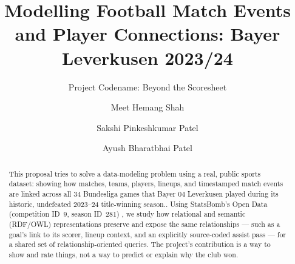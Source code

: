 \documentclass[sigconf,nonacm]{acmart}
\begin{document}
\title{Modelling Football Match Events and Player Connections: Bayer Leverkusen 2023/24}
\subtitle{Project Codename: Beyond the Scoresheet}

\author{Meet Hemang Shah}

\author{Sakshi Pinkeshkumar Patel}

\author{Ayush Bharatbhai Patel}

\begin{abstract}
This proposal tries to solve a data-modeling problem using a real, public sports dataset: showing how matches, teams, players, lineups, and timestamped match events are linked across all 34 Bundesliga games that Bayer 04 Leverkusen played during its historic, undefeated 2023–24 title-winning season.\cite{reuters2024}. Using StatsBomb's Open Data (competition ID~9, season
ID~281) \cite{statsbomb-open,statsbomb-list}, we study how relational and
semantic (RDF/OWL) representations preserve and expose the same
relationships --- such as a goal's link to its scorer, lineup context, and an
explicitly source-coded assist pass --- for a shared set of
relationship-oriented queries. The project's contribution is a way to show and rate things, not a way to predict or explain why the club won. 
\end{abstract}


\maketitle

\end{document}
